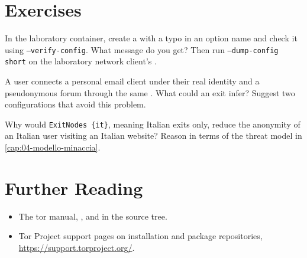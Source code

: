 \section*{Exercises}

\begin{esercizio}[1]\label{es:17-verifica}
In the laboratory container, create a  with a typo in an option name and check it using \texttt{--verify-config}. What message do you get? Then run \texttt{--dump-config short} on the laboratory network client's .
\end{esercizio}

\begin{esercizio}[2]\label{es:17-isolamento}
A user connects a personal email client under their real identity and a pseudonymous forum through the same . What could an exit infer? Suggest two configurations that avoid this problem.
\end{esercizio}

\begin{esercizio}[2]\label{es:17-exitnodes}
Why would \texttt{ExitNodes \{it\}}, meaning Italian exits only, reduce the anonymity of an Italian user visiting an Italian website? Reason in terms of the threat model in \cref{cap:04-modello-minaccia}.
\end{esercizio}

\section*{Further Reading}
\begin{itemize}
  \item The tor manual, , and  in the source tree.
  \item Tor Project support pages on installation and package repositories, \url{https://support.torproject.org/}.
\end{itemize}
